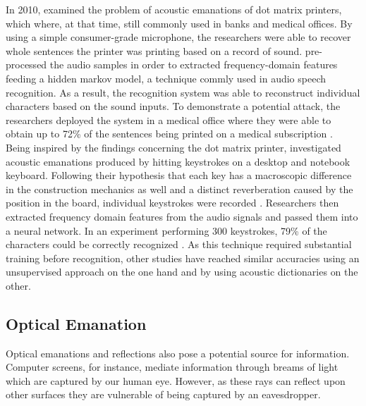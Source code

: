 In 2010, \citeauthor{Backes:2010:ASA:1929820.1929847} examined the problem of acoustic emanations of dot matrix printers, which where, at that time, still commonly used in banks and medical offices. By using a simple consumer-grade microphone, the researchers were able to recover whole sentences the printer was printing based on a record of sound. \citeauthor{Backes:2010:ASA:1929820.1929847} pre-processed the audio samples in order to extracted frequency-domain features feeding a hidden markov model, a technique commly used in audio speech recognition. As a result, the recognition system was able to reconstruct individual characters based on the sound inputs. To demonstrate a potential attack, the researchers deployed the system in a medical office where they were able to obtain up to 72\% of the sentences being printed on a medical subscription \cite{Backes:2010:ASA:1929820.1929847}. \\

Being inspired by the findings concerning the dot matrix printer, \citeauthor{1301311} investigated acoustic emanations produced by hitting keystrokes on a desktop and notebook keyboard. Following their hypothesis that each key has a macroscopic difference in the construction mechanics as well and a distinct reverberation caused by the position in the board, individual keystrokes were recorded \cite{1301311}. Researchers then extracted frequency domain features from the audio signals and passed them into a neural network. In an experiment performing 300 keystrokes, 79\% of the characters could be correctly recognized \cite{1301311}. As this technique required substantial training before recognition, other studies have reached similar accuracies using an unsupervised approach \cite{Zhuang:2009:KAE:1609956.1609959} on the one hand and by using acoustic dictionaries \cite{Berger:2006:DAU:1180405.1180436} on the other.

\subsection{Optical Emanation}
Optical emanations and reflections also pose a potential source for information. Computer screens, for instance, mediate information through breams of light which are captured by our human eye. However, as these rays can reflect upon other surfaces they are vulnerable of being captured by an eavesdropper. \\

